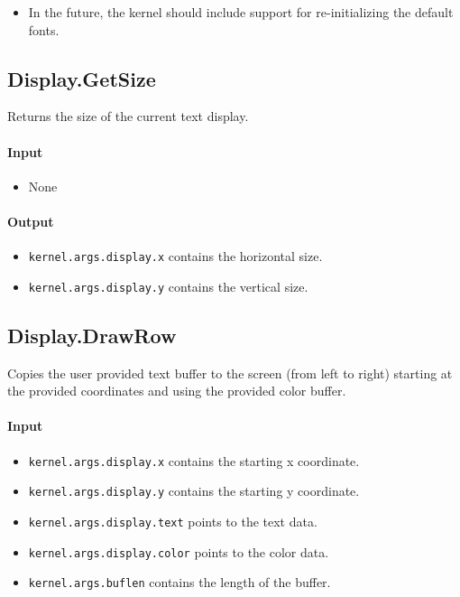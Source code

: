 \begin{itemize}
\item In the future, the kernel should include support for re-initializing the default fonts.
\end{itemize}

\subsection*{Display.GetSize}
Returns the size of the current text display.

\paragraph{Input}

\begin{itemize}
\item None
\end{itemize}

\paragraph{Output}

\begin{itemize}
\item \verb+kernel.args.display.x+ contains the horizontal size.
\item \verb+kernel.args.display.y+ contains the vertical size.
\end{itemize}

\subsection*{Display.DrawRow}
Copies the user provided text buffer to the screen (from left to right) starting at the provided coordinates and using the provided color buffer.

\paragraph{Input}

\begin{itemize}
\item \verb+kernel.args.display.x+ contains the starting x coordinate.
\item \verb+kernel.args.display.y+ contains the starting y coordinate.
\item \verb+kernel.args.display.text+ points to the text data.
\item \verb+kernel.args.display.color+ points to the color data.
\item \verb+kernel.args.buflen+ contains the length of the buffer.
\end{itemize}

